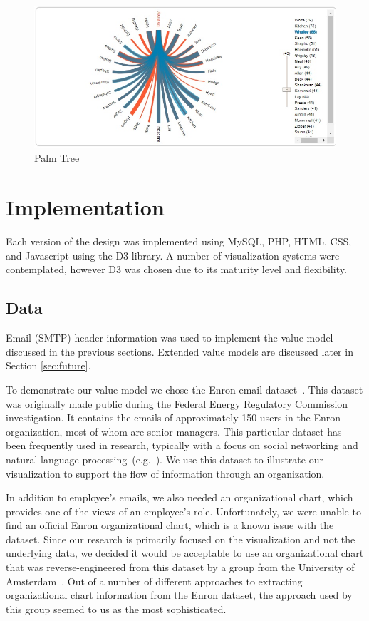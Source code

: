 \documentclass[journal]{vgtc}                %
\begin{document}
\begin{figure}
  \centering
  \includegraphics[width=\columnwidth]{pictures/palmtree.jpg}
  \caption{Palm Tree}
  \label{fig:palm}
\end{figure}

\section{Implementation}
\label{sec:implementation}
Each version of the design was implemented using MySQL, PHP, HTML, CSS, and Javascript using the D3 library.  A number of visualization systems were contemplated, however D3 was chosen due to its maturity level and flexibility.

\subsection{Data}
Email (SMTP) header information was used to implement the value model discussed in the previous sections. Extended value models are discussed later in Section \ref{sec:future}.

To demonstrate our value model we chose the Enron email dataset~\cite{cmuenron,klimt2004introducing}. This dataset was originally made public during the Federal Energy Regulatory Commission investigation.  It contains the emails of approximately 150 users in the Enron organization, most of whom are senior managers.  This particular dataset has been frequently used in research, typically with a focus on social networking and natural language processing~(e.g.~\cite{diesner2005exploration}). We use this dataset to illustrate our visualization to support the flow of information through an organization.  

In addition to employee's emails, we also needed an organizational chart, which provides one of the views of an employee's role.  Unfortunately, we were unable to find an official Enron organizational chart, which is a known issue with the dataset.  Since our research is primarily focused on the visualization and not the underlying data, we decided it would be acceptable to use an organizational chart that was reverse-engineered from this dataset by a group from the University of Amsterdam~\cite{rowe2007automated}. Out of a number of different approaches to extracting organizational chart information from the Enron dataset, the approach used by this group seemed to us as the most sophisticated.
\end{document}
